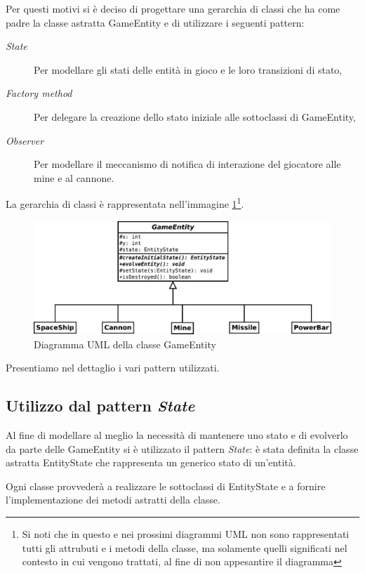 \documentclass[a4paper,12pt]{article}
\begin{document}
Per questi motivi si \`e deciso di progettare una gerarchia di classi che ha come padre la classe astratta \textsf{GameEntity} e di utilizzare i seguenti pattern:
\begin{description}
\item[\emph{State}] Per modellare gli stati delle entit\`a in gioco e le loro transizioni di stato,
\item[\emph{Factory method}] Per delegare la creazione dello stato iniziale alle sottoclassi di \textsf{GameEntity},
\item[\emph{Observer}] Per modellare il meccanismo di notifica di interazione del giocatore alle mine e al cannone.
\end{description}

La gerarchia di classi \`e rappresentata nell'immagine \ref{img:GameEntity}\footnote{Si noti che in questo e nei prossimi diagrammi UML non sono rappresentati tutti gli attrubuti e i metodi della classe, ma solamente quelli significati nel contesto in cui vengono trattati, al fine di non appesantire il diagramma}.

\begin{figure}[h]
\centering
\includegraphics[width=15cm]{GameEntity.pdf}
\caption{Diagramma UML della classe \textsf{GameEntity}}
\label{img:GameEntity}
\end{figure}

Presentiamo nel dettaglio i vari pattern utilizzati.

\subsection{Utilizzo dal pattern \emph{State}}

Al fine di modellare al meglio la necessit\`a di mantenere uno stato e di evolverlo da parte delle \textsf{GameEntity} si \`e utilizzato il pattern \emph{State}: \`e stata definita la classe astratta \textsf{EntityState} che rappresenta un generico stato di un'entit\`a.

Ogni classe provveder\`a a realizzare le sottoclassi di \textsf{EntityState} e a fornire l'implementazione dei metodi astratti della classe.
\end{document}
